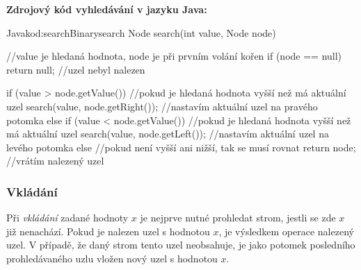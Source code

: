 \documentclass[
  biblatex=false,
  font=serif,
  glossaries=false,
  tables=false,
  theorems=false,
  index
]{kidiplom}
\begin{document}
\medskip \medskip \medskip
\noindent \textbf{Zdrojový kód vyhledávání v jazyku Java:}

\begin{kicode}{Java}{kod:searchBinary}{search}
Node search(int value, Node node) { //value je hledaná hodnota, node je při prvním volání kořen
	if (node == null) {
		return null; //uzel nebyl nalezen
	}
	
	if (value > node.getValue()) { //pokud je hledaná hodnota vyšší než má aktuální uzel
		search(value, node.getRight()); //nastavím aktuální uzel na pravého potomka
	} else if (value < node.getValue()) { //pokud je hledaná hodnota vyšší než má aktuální uzel
		search(value, node.getLeft()); //nastavím aktuální uzel na levého potomka
	} else { //pokud není vyšší ani nižší, tak se musí rovnat
		return node; //vrátím nalezený uzel
	}
}
\end{kicode}


\newpage
\subsubsection{Vkládání}
\indent\indent Při \textit{vkládání} zadané hodnoty $x$ je nejprve nutné prohledat strom, jestli se zde $x$ již nenachází. Pokud je nalezen uzel s hodnotou $x$, je výsledkem operace nalezený uzel. V případě, že daný strom tento uzel neobsahuje, je jako potomek posledního prohledávaného uzlu vložen nový uzel s hodnotou $x$. \\
\end{document}
